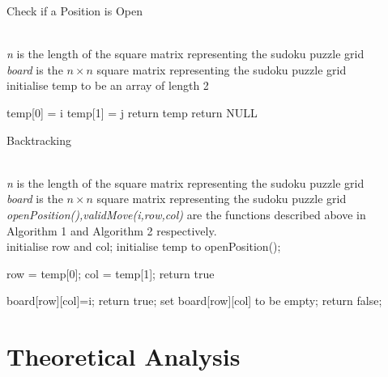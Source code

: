 \documentclass[12pt,a4paper,titlepage]{article}
\begin{document}
\begin{algorithm}[H]
\caption{Check if a Position is Open}
\begin{algorithmic}[1]
\\
\textit{n} is the length of the square matrix representing the sudoku puzzle grid
\\
\textit{board} is the $n \times n$ square matrix representing the sudoku puzzle grid 
\\ 
\State initialise temp to be an array of length 2
  
				\State temp[0] = i
				\State temp[1] = j
				\State return temp 
			\EndIf       
		\EndFor
	\EndFor
	\State  return NULL
\EndFunction

\end{algorithmic}
\end{algorithm}


\begin{algorithm}[H]
\caption{Backtracking}
\begin{algorithmic}[1]
\\
\textit{n} is the length of the square matrix representing the sudoku puzzle grid 
\\
\textit{board} is the $n \times n$ square matrix representing the sudoku puzzle grid
\\
\textit{openPosition(),validMove(i,row,col)} are the functions described above in Algorithm 1 and Algorithm 2 respectively.
\\ 
	\State initialise row and col; 
	\State initialise temp to openPosition();	

		\State row = temp[0];
		\State col = temp[1];
  	\Else
		\State return true
	\EndIf  
	
			\State board[row][col]=i;
       			\State return true;
       		\EndIf       
			\State set board[row][col] to be empty;
		\EndIf
	\EndFor
	\State  return false;
\EndFunction

\end{algorithmic}
\end{algorithm}

\section{Theoretical Analysis }
\end{document}
